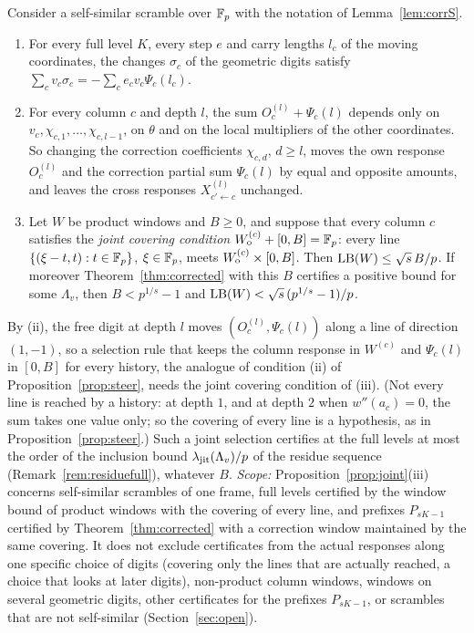 \begin{proposition}\label{prop:joint}
Consider a self-similar scramble over $\mathbb{F}_p$ with the notation of Lemma~\ref{lem:corrS}.
\begin{enumerate}
\item[(i)] For every full level $K$, every step $e$ and carry lengths $l_c$ of the moving coordinates, the changes $\sigma_c$ of the geometric digits satisfy $\sum_cv_c\sigma_c=-\sum_ce_cv_c\Psi_c(l_c)$.
\item[(ii)] For every column $c$ and depth $l$, the sum $O_c^{(l)}+\Psi_c(l)$ depends only on $v_c,\chi_{c,1},\dots,\chi_{c,l-1}$, on $\theta$ and on the local multipliers of the other coordinates. So changing the correction coefficients $\chi_{c,d}$, $d\ge l$, moves the own response $O_c^{(l)}$ and the correction partial sum $\Psi_c(l)$ by equal and opposite amounts, and leaves the cross responses $X^{(l)}_{c'\leftarrow c}$ unchanged.
\item[(iii)] Let $W$ be product windows and $B\ge0$, and suppose that every column $c$ satisfies the \emph{joint covering condition} $W_{\mathrm o}^{(c)}+[0,B]=\mathbb{F}_p$: every line $\{(\xi-t,t):t\in\mathbb{F}_p\}$, $\xi\in\mathbb{F}_p$, meets $W_{\mathrm o}^{(c)}\times[0,B]$. Then $\mathrm{LB}(W)\le\sqrt s\,B/p$. If moreover Theorem~\ref{thm:corrected} with this $B$ certifies a positive bound for some $\Lambda_v$, then $B<p^{1/s}-1$ and $\mathrm{LB}(W)<\sqrt s\,(p^{1/s}-1)/p$.
\end{enumerate}
\end{proposition}
By (ii), the free digit at depth $l$ moves $(O_c^{(l)},\Psi_c(l))$ along a line of direction $(1,-1)$, so a selection rule that keeps the column response in $W^{(c)}$ and $\Psi_c(l)$ in $[0,B]$ for every history, the analogue of condition (ii) of Proposition~\ref{prop:steer}, needs the joint covering condition of (iii). (Not every line is reached by a history: at depth $1$, and at depth $2$ when $w''(a_c)=0$, the sum takes one value only; so the covering of every line is a hypothesis, as in Proposition~\ref{prop:steer}.) Such a joint selection certifies at the full levels at most the order of the inclusion bound $\lambda_{\mathrm{jit}}(\Lambda_v)/p$ of the residue sequence (Remark~\ref{rem:residuefull}), whatever $B$. \emph{Scope:} Proposition~\ref{prop:joint}(iii) concerns self-similar scrambles of one frame, full levels certified by the window bound of product windows with the covering of every line, and prefixes $P_{sK-1}$ certified by Theorem~\ref{thm:corrected} with a correction window maintained by the same covering. It does not exclude certificates from the actual responses along one specific choice of digits (covering only the lines that are actually reached, a choice that looks at later digits), non-product column windows, windows on several geometric digits, other certificates for the prefixes $P_{sK-1}$, or scrambles that are not self-similar (Section~\ref{sec:open}).
